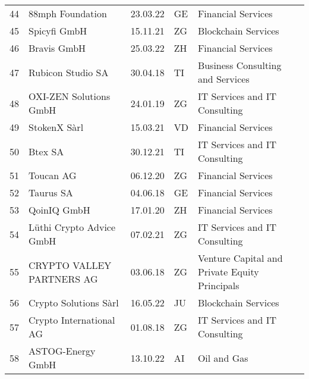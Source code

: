 \begin{tabular}{lllll}
44  &                                   88mph Foundation &      23.03.22 &     GE &                             Financial Services \\
45  &                                       Spicyfi GmbH &      15.11.21 &     ZG &                            Blockchain Services \\
46  &                                        Bravis GmbH &      25.03.22 &     ZH &                             Financial Services \\
47  &                                  Rubicon Studio SA &      30.04.18 &     TI &               Business Consulting and Services \\
48  &                             OXI-ZEN Solutions GmbH &      24.01.19 &     ZG &                  IT Services and IT Consulting \\
49  &                                       StokenX Sàrl &      15.03.21 &     VD &                             Financial Services \\
50  &                                            Btex SA &      30.12.21 &     TI &                  IT Services and IT Consulting \\
51  &                                          Toucan AG &      06.12.20 &     ZG &                             Financial Services \\
52  &                                          Taurus SA &      04.06.18 &     GE &                             Financial Services \\
53  &                                        QoinIQ GmbH &      17.01.20 &     ZH &                             Financial Services \\
54  &                           Lüthi Crypto Advice GmbH &      07.02.21 &     ZG &                  IT Services and IT Consulting \\
55  &                          CRYPTO VALLEY PARTNERS AG &      03.06.18 &     ZG &  Venture Capital and Private Equity Principals \\
56  &                              Crypto Solutions Sàrl &      16.05.22 &     JU &                            Blockchain Services \\
57  &                            Crypto International AG &      01.08.18 &     ZG &                  IT Services and IT Consulting \\
58  &                                  ASTOG-Energy GmbH &      13.10.22 &     AI &                                    Oil and Gas \\

\end{tabular}

